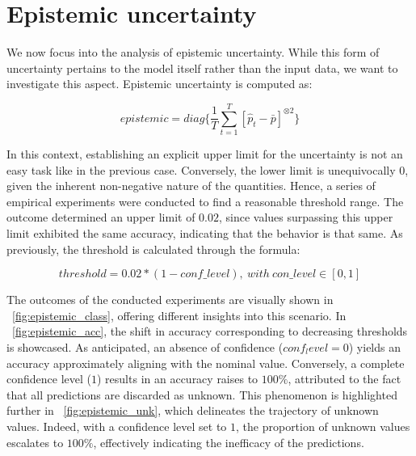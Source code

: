 \section{Epistemic uncertainty}

We now focus into the analysis of epistemic uncertainty. While this form of uncertainty pertains to the model itself rather than the input data, we want to investigate this aspect. Epistemic uncertainty is computed as:

\[
	epistemic = diag\{\frac{1}{T} \sum_{t=1}^{T} [\hat{p}_t - \bar{p}]^{\otimes 2}\}
\]

In this context, establishing an explicit upper limit for the uncertainty is not an easy task like in the previous case. Conversely, the lower limit is unequivocally $0$, given the inherent non-negative nature of the quantities. Hence, a series of empirical experiments were conducted to find a reasonable threshold range. The outcome determined an upper limit of $0.02$, since values surpassing this upper limit exhibited the same accuracy, indicating that the behavior is that same. As previously, the threshold is calculated through the formula:

\[
	threshold = 0.02 * (1 - conf \_ level), \ with \ con \_ level \in [0,1]
\]

The outcomes of the conducted experiments are visually shown in \Fig~\ref{fig:epistemic_class}, offering different insights into this scenario. In \Fig~\ref{fig:epistemic_acc}, the shift in accuracy corresponding to decreasing thresholds is showcased. As anticipated, an absence of confidence ($conf_level = 0$) yields an accuracy approximately aligning with the nominal value. Conversely, a complete confidence level ($1$) results in an accuracy raises to $100\%$, attributed to the fact that all predictions are discarded as unknown. This phenomenon is highlighted further in \Fig~\ref{fig:epistemic_unk}, which delineates the trajectory of unknown values. Indeed, with a confidence level set to $1$, the proportion of unknown values escalates to $100\%$, effectively indicating the inefficacy of the predictions.

